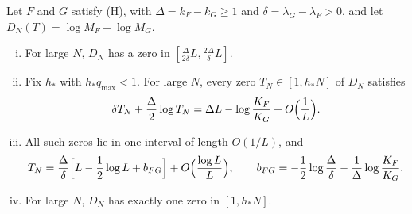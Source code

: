 \begin{theorem}\label{thm:crossing}
Let $F$ and $G$ satisfy \textup{(H)}, with $\Delta=k_F-k_G\ge1$ and
$\delta=\lambda_G-\lambda_F>0$, and let $D_N(T)=\log M_F-\log M_G$.
\begin{enumerate}[(i)]
\item For large $N$, $D_N$ has a zero in
$[\frac{\Delta}{2\delta}L,\frac{2\Delta}{\delta}L]$.
\item Fix $h_*$ with $h_*q_{\max}<1$. For large $N$, every zero $T_N\in[1,h_*N]$ of
$D_N$ satisfies
\begin{equation}\label{eq:crossing}
\delta T_N+\frac\Delta2\log T_N=\Delta L-\log\frac{K_F}{K_G}
+O\Bigl(\frac1L\Bigr).
\end{equation}
\item All such zeros lie in one interval of length $O(1/L)$, and
\[
T_N=\frac\Delta\delta\Bigl[L-\frac12\log L+b_{FG}\Bigr]
+O\Bigl(\frac{\log L}L\Bigr),\qquad
b_{FG}=-\frac12\log\frac\Delta\delta-\frac1\Delta\log\frac{K_F}{K_G}.
\]
\item For large $N$, $D_N$ has exactly one zero in $[1,h_*N]$.
\end{enumerate}
\end{theorem}


